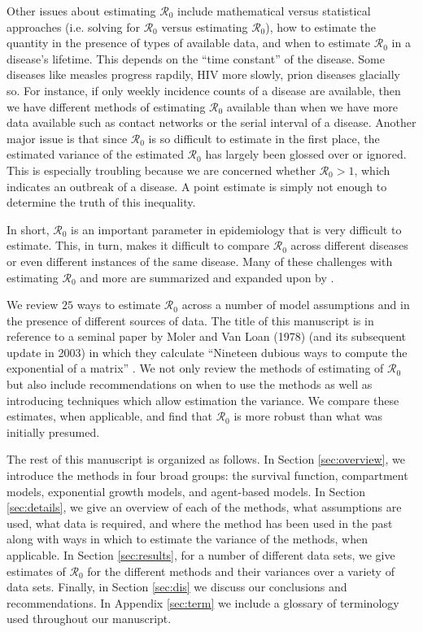\documentclass[12pt]{article}
\newcommand{\XX}{\ensuremath{25}} %
\newcommand{\rr}{\ensuremath{\mathcal{R}_0}}
\begin{document}
Other issues about estimating $\rr$ include mathematical versus statistical approaches (i.e. solving for $\rr$ versus estimating $\rr$), how to estimate the quantity in the presence of types of available data, and when to estimate $\rr$ in a disease's lifetime.  This depends on the ``time constant'' of the disease.  Some diseases like measles progress rapdily, HIV more slowly, prion diseases glacially so.  For instance, if only weekly incidence counts of a disease are available, then we have different methods of estimating $\rr$ available than when we have more data available such as contact networks or the serial interval of a disease.  Another major issue is that since $\rr$ is so difficult to estimate in the first place, the estimated variance of the estimated $\rr$ has largely been glossed over or  ignored.  This is especially troubling because we are concerned whether $\rr > 1$, which indicates an outbreak of a disease.  A point estimate is simply not enough to determine the truth of this inequality.

In short, $\rr$ is an important parameter in epidemiology that is very difficult to estimate.  This, in turn, makes it difficult to compare $\rr$ across different diseases or even different instances of the same disease.  Many of these challenges with estimating $\rr$ and more are summarized and expanded upon by \cite{li2011}.

We review $\XX$ ways to estimate $\rr$ across a number of model assumptions and in the presence of different sources of data.  The title of this manuscript is in reference to a seminal paper by Moler and Van Loan (1978) (and its subsequent update in 2003) in which they calculate ``Nineteen dubious ways to compute the exponential of a matrix'' \citep{moler2003}.  We not only review the methods of estimating of $\rr$ but also include recommendations on when to use the methods as well as introducing techniques which allow estimation the variance.  We compare these estimates, when applicable, and find that $\rr$ is more robust than what was initially presumed.

The rest of this manuscript is organized as follows.  In Section \ref{sec:overview}, we introduce the methods in four broad groups: the survival function, compartment models, exponential growth models, and agent-based models.    In Section \ref{sec:details}, we give an overview of each of the methods, what assumptions are used, what data is required, and where the method has been used in the past along with ways in which to estimate the variance of the methods, when applicable.  In Section \ref{sec:results}, for a number of different data sets, we give estimates of $\rr$ for the different methods and their variances over a variety of data sets.  Finally, in Section \ref{sec:dis} we discuss our conclusions and recommendations.  In Appendix \ref{sec:term} we include a glossary of terminology used throughout our manuscript.
\end{document}
